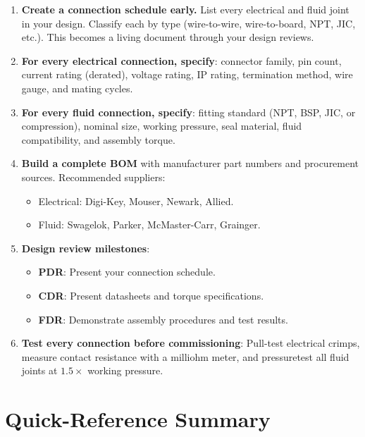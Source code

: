 \begin{enumerate}[leftmargin=1.5em]
  \item \textbf{Create a connection schedule early.} List every electrical and fluid joint in your design. Classify each by type (wire-to-wire, wire-to-board, NPT, JIC, etc.). This becomes a living document through your design reviews.

  \item \textbf{For every electrical connection, specify}: connector family, pin count, current rating (derated), voltage rating, IP rating, termination method, wire gauge, and mating cycles.

  \item \textbf{For every fluid connection, specify}: fitting standard (NPT, BSP, JIC, or compression), nominal size, working pressure, seal material, fluid compatibility, and assembly torque.

  \item \textbf{Build a complete BOM} with manufacturer part numbers and procurement sources. Recommended suppliers:
  \begin{itemize}[nosep]
    \item Electrical: Digi-Key, Mouser, Newark, Allied.
    \item Fluid: Swagelok, Parker, McMaster-Carr, Grainger.
  \end{itemize}

  \item \textbf{Design review milestones}:
  \begin{itemize}[nosep]
    \item \textbf{PDR}: Present your connection schedule.
    \item \textbf{CDR}: Present datasheets and torque specifications.
    \item \textbf{FDR}: Demonstrate assembly procedures and test results.
  \end{itemize}

  \item \textbf{Test every connection before commissioning}: Pull-test electrical crimps, measure contact resistance with a milliohm meter, and pressuretest all fluid joints at $1.5\times$ working pressure.
\end{enumerate}


\section{Quick-Reference Summary}

